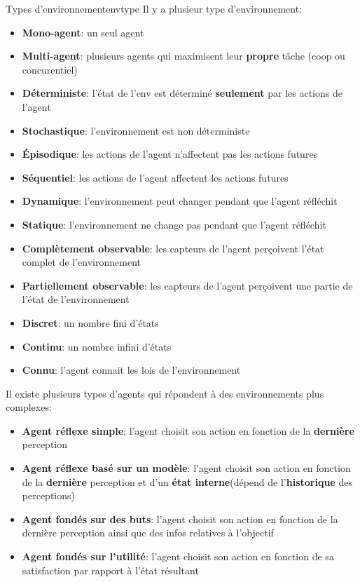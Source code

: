 \documentclass[a4paper, 12pt]{extarticle}
\begin{document}
\begin{definition}{Types d'environnement}{envtype}
    Il y a plusieur type d'environnement:

    \begin{itemize}
        \item \textbf{Mono-agent}: un seul agent
        \item \textbf{Multi-agent}: plusieurs agents qui maximisent leur \textbf{propre} tâche (coop ou concurentiel)
        \item \textbf{Déterministe}: l'état de l'env est déterminé \textbf{seulement} par les actions de l'agent
        \item \textbf{Stochastique}: l'environnement est non déterministe
        \item \textbf{Épisodique}: les actions de l'agent n'affectent pas les actions futures
        \item \textbf{Séquentiel}: les actions de l'agent affectent les actions futures
        \item \textbf{Dynamique}: l'environnement peut changer pendant que l'agent réfléchit
        \item \textbf{Statique}: l'environnement ne change pas pendant que l'agent réfléchit
        \item \textbf{Complètement observable}: les capteurs de l'agent perçoivent l'état complet de l'environnement
        \item \textbf{Partiellement observable}: les capteurs de l'agent perçoivent une partie de l'état de l'environnement
        \item \textbf{Discret}: un nombre fini d'états
        \item \textbf{Continu}: un nombre infini d'états
        \item \textbf{Connu}: l'agent connait les lois de l'environnement
    \end{itemize}
\end{definition}

Il existe plusieurs types d'agents qui répondent à des environnements plus complexes:
\begin{itemize}
    \item \textbf{Agent réflexe simple}: l'agent choisit son action en fonction de la \textbf{dernière} perception
    \item \textbf{Agent réflexe basé sur un modèle}: l'agent choisit son action en fonction de la \textbf{dernière} perception et d'un \textbf{état interne}(dépend de l'\textbf{historique} des perceptions) 
    \item \textbf{Agent fondés sur des buts}: l'agent choisit son action en fonction de la dernière perception 
        ainsi que des infos relatives à l'objectif
    \item \textbf{Agent fondés sur l'utilité}: l'agent choisit son action en fonction de 
        sa satisfaction par rapport à l'état résultant
\end{itemize}
\end{document}
